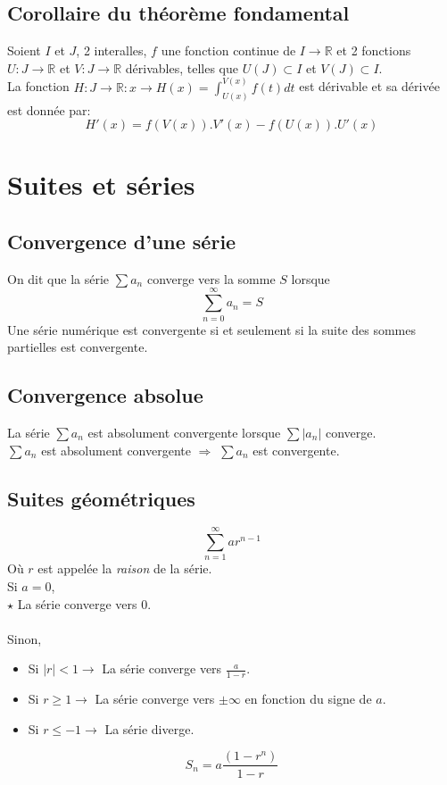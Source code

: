 \subsection{Corollaire du théorème fondamental}
Soient $I$ et $J$, 2 interalles, $f$ une fonction continue de $I \rightarrow \mathbb{R}$ et 2 fonctions $U : J \rightarrow \mathbb{R}$ et $V : J \rightarrow \mathbb{R}$ dérivables,  telles que $U(J) \subset I$ et $V(J) \subset I$.\\
La fonction $H : J \rightarrow \mathbb{R} : x \rightarrow H(x) = \int_{U(x)}^{V(x)} f(t) dt$ est dérivable et sa dérivée est donnée par:
\[H'(x) = f(V(x)).V'(x) - f(U(x)).U'(x)\]

\section{Suites et séries}
\subsection{Convergence d'une série}
On dit que la série $\sum a_n$ converge vers la somme $S$ lorsque \[\sum_{n =0}^{\infty} a_n = S\]
Une série numérique est convergente si et seulement si la suite des sommes partielles est
convergente.
\subsection{Convergence absolue}
La série $\sum a_n$ est absolument convergente lorsque $\sum |a_n|$ converge.\\
$\sum a_n$ est absolument convergente $\Rightarrow$ $\sum a_n$ est convergente.

\subsection{Suites géométriques}
\[\sum_{n = 1}^{\infty} ar^{n-1}\]
Où $r$ est appelée la \emph{raison} de la série.\\
Si $a =0$,\\
 $\star$ La série converge vers 0.\\\\
Sinon,
\begin{itemize}
\item Si $|r| < 1 \rightarrow$ La série converge vers $\frac{a}{1 - r}$.
\item Si $r \geq 1 \rightarrow$ La série converge vers $\pm \infty$ en fonction du signe de $a$.
\item Si $r \leq -1 \rightarrow$ La série diverge.
\end{itemize}
\[S_n = a\frac{(1 - r^n)}{1- r}\]
